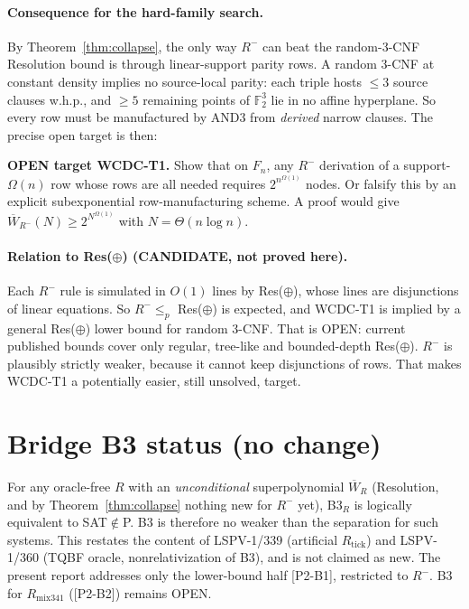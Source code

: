 \documentclass[11pt]{article}
\begin{document}
\paragraph{Consequence for the hard-family search.} By Theorem~\ref{thm:collapse}, the only way $R^-$ can beat the random-3-CNF Resolution bound is through linear-support parity rows. A random 3-CNF at constant density implies no source-local parity: each triple hosts $\le 3$ source clauses w.h.p., and $\ge 5$ remaining points of $\mathbb F_2^3$ lie in no affine hyperplane. So every row must be manufactured by AND3 from \emph{derived} narrow clauses. The precise open target is then:

\smallskip\noindent\textbf{OPEN target WCDC-T1.} Show that on $F_n$, any $R^-$ derivation of a support-$\Omega(n)$ row whose rows are all needed requires $2^{n^{\Omega(1)}}$ nodes. Or falsify this by an explicit subexponential row-manufacturing scheme. A proof would give $\overline W_{R^-}(N)\ge 2^{N^{\Omega(1)}}$ with $N=\Theta(n\log n)$.

\paragraph{Relation to Res($\oplus$) (CANDIDATE, not proved here).} Each $R^-$ rule is simulated in $O(1)$ lines by Res($\oplus$), whose lines are disjunctions of linear equations. So $R^-\le_p$ Res($\oplus$) is expected, and WCDC-T1 is implied by a general Res($\oplus$) lower bound for random 3-CNF. That is OPEN: current published bounds cover only regular, tree-like and bounded-depth Res($\oplus$). $R^-$ is plausibly strictly weaker, because it cannot keep disjunctions of rows. That makes WCDC-T1 a potentially easier, still unsolved, target.

\section{Bridge B3 status (no change)}
For any oracle-free $R$ with an \emph{unconditional} superpolynomial $\overline W_R$ (Resolution, and by Theorem~\ref{thm:collapse} nothing new for $R^-$ yet), B3$_R$ is logically equivalent to SAT$\notin$P. B3 is therefore no weaker than the separation for such systems. This restates the content of LSPV-1/339 (artificial $R_{\mathrm{tick}}$) and LSPV-1/360 (TQBF oracle, nonrelativization of B3), and is not claimed as new. The present report addresses only the lower-bound half [P2-B1], restricted to $R^-$. B3 for $R_{\mathrm{mix341}}$ ([P2-B2]) remains OPEN.
\end{document}
